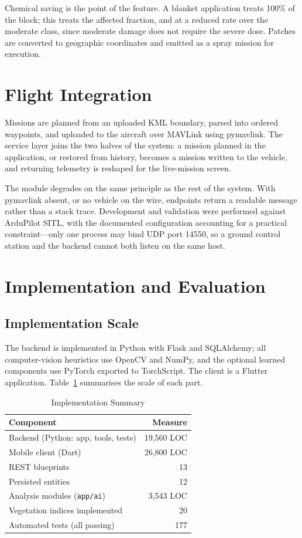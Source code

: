 \documentclass[conference]{IEEEtran}
\begin{document}
Chemical saving is the point of the feature. A blanket application treats 100\%
of the block; this treats the affected fraction, and at a reduced rate over the
moderate class, since moderate damage does not require the severe dose. Patches
are converted to geographic coordinates and emitted as a spray mission for
execution.

\section{Flight Integration}

Missions are planned from an uploaded KML boundary, parsed into ordered
waypoints, and uploaded to the aircraft over MAVLink \cite{mavlink} using
pymavlink. The service layer joins the two halves of the system: a mission
planned in the application, or restored from history, becomes a mission written
to the vehicle, and returning telemetry is reshaped for the live-mission screen.

The module degrades on the same principle as the rest of the system. With
pymavlink absent, or no vehicle on the wire, endpoints return a readable
message rather than a stack trace. Development and validation were performed
against ArduPilot SITL, with the documented configuration accounting for a
practical constraint---only one process may bind UDP port 14550, so a ground
control station and the backend cannot both listen on the same host.

\section{Implementation and Evaluation}

\subsection{Implementation Scale}

The backend is implemented in Python with Flask and SQLAlchemy; all
computer-vision heuristics use OpenCV \cite{bradski2000} and NumPy, and the
optional learned components use PyTorch \cite{paszke2019} exported to
TorchScript. The client is a Flutter application. Table~\ref{tab:impl}
summarises the scale of each part.

\begin{table}[!t]
\caption{Implementation Summary}
\label{tab:impl}
\centering
\footnotesize
\begin{tabular}{@{}lr@{}}
\toprule
Component & Measure \\
\midrule
Backend (Python: app, tools, tests) & 19{,}560 LOC \\
Mobile client (Dart) & 26{,}800 LOC \\
REST blueprints & 13 \\
Persisted entities & 12 \\
Analysis modules (\texttt{app/ai}) & 3{,}543 LOC \\
Vegetation indices implemented & 20 \\
Automated tests (all passing) & 177 \\
\bottomrule
\end{tabular}
\end{table}
\end{document}
